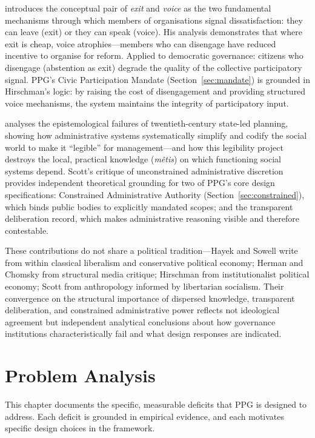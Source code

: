 \documentclass[12pt,a4paper,oneside]{report}
\begin{document}
\citet{hirschman1970exit} introduces the conceptual pair of \emph{exit} and \emph{voice} as the two fundamental mechanisms through which members of organisations signal dissatisfaction: they can leave (exit) or they can speak (voice). His analysis demonstrates that where exit is cheap, voice atrophies---members who can disengage have reduced incentive to organise for reform. Applied to democratic governance: citizens who disengage (abstention as exit) degrade the quality of the collective participatory signal. PPG's Civic Participation Mandate (Section~\ref{sec:mandate}) is grounded in Hirschman's logic: by raising the cost of disengagement and providing structured voice mechanisms, the system maintains the integrity of participatory input.

\citet{scott1998seeing} analyses the epistemological failures of twentieth-century state-led planning, showing how administrative systems systematically simplify and codify the social world to make it ``legible'' for management---and how this legibility project destroys the local, practical knowledge (\textit{m\^etis}) on which functioning social systems depend. Scott's critique of unconstrained administrative discretion provides independent theoretical grounding for two of PPG's core design specifications: Constrained Administrative Authority (Section~\ref{sec:constrained}), which binds public bodies to explicitly mandated scopes; and the transparent deliberation record, which makes administrative reasoning visible and therefore contestable.

These contributions do not share a political tradition---Hayek and Sowell write from within classical liberalism and conservative political economy; Herman and Chomsky from structural media critique; Hirschman from institutionalist political economy; Scott from anthropology informed by libertarian socialism. Their convergence on the structural importance of dispersed knowledge, transparent deliberation, and constrained administrative power reflects not ideological agreement but independent analytical conclusions about how governance institutions characteristically fail and what design responses are indicated.

\chapter{Problem Analysis}
\label{sec:problem}

This chapter documents the specific, measurable deficits that PPG is designed to address. Each deficit is grounded in empirical evidence, and each motivates specific design choices in the framework.
\end{document}
